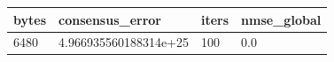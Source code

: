 \begin{tabular}{llll}
\toprule
bytes & consensus_error & iters & nmse_global\\ \midrule
6480 & 4.966935560188314e+25 & 100 & 0.0\\
\bottomrule
\end{tabular}